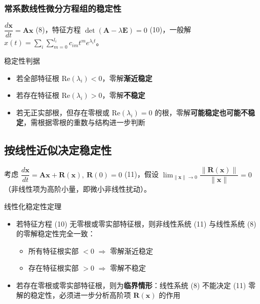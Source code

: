\subsubsection{常系数线性微分方程组的稳定性}

$\dfrac{d\mathbf{x}}{dt} = \mathbf{A}\mathbf{x}$ (8)，特征方程 $\det(\mathbf{A} - \lambda\mathbf{E}) = 0$ (10)，一般解 $x(t) = \sum_i \sum_{m=0}^{l_i} c_{im}t^m e^{\lambda_i t}$。

\begin{myTheorem}{稳定性判据}
\begin{itemize}
    \item 若全部特征根 $\mathrm{Re}(\lambda_i) < 0$，零解\textbf{渐近稳定}
    \item 若存在特征根 $\mathrm{Re}(\lambda_i) > 0$，零解\textbf{不稳定}
    \item 若无正实部根，但存在零根或 $\mathrm{Re}(\lambda_i) = 0$ 的根，零解\textbf{可能稳定也可能不稳定}，需根据零根的重数与结构进一步判断
\end{itemize}
\end{myTheorem}

\subsection{按线性近似决定稳定性}

考虑 $\dfrac{d\mathbf{x}}{dt} = \mathbf{A}\mathbf{x} + \mathbf{R}(\mathbf{x}), \ \mathbf{R}(0) = 0$ (11)，假设 $\lim_{\|\mathbf{x}\|\to 0}\dfrac{\|\mathbf{R}(\mathbf{x})\|}{\|\mathbf{x}\|} = 0$（非线性项为高阶小量，即微小非线性扰动）。

\begin{myTheorem}{线性化稳定性定理}
\begin{itemize}
    \item 若特征方程 (10) 无零根或零实部特征根，则非线性系统 (11) 与线性系统 (8) 的零解稳定性完全一致：
    \begin{itemize}
        \item 所有特征根实部 $< 0$ $\Rightarrow$ 零解渐近稳定
        \item 存在特征根实部 $> 0$ $\Rightarrow$ 零解不稳定
    \end{itemize}
    \item 若存在零根或零实部特征根，则为\textbf{临界情形}：线性系统 (8) 不能决定 (11) 零解的稳定性，必须进一步分析高阶项 $\mathbf{R}(\mathbf{x})$ 的作用
\end{itemize}
\end{myTheorem}

